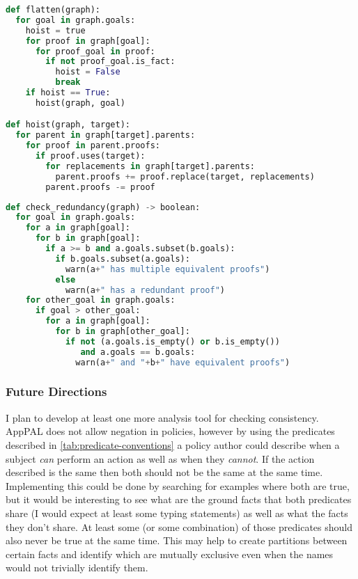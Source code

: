 \documentclass[a4paper]{scrartcl}
\begin{document}
\begin{lstlisting}[language=Python,float,caption={Procedure for flattening the redundancy graph.},label={alg:flatten}]
def flatten(graph):
  for goal in graph.goals:
    hoist = true
    for proof in graph[goal]:
      for proof_goal in proof:
        if not proof_goal.is_fact:
          hoist = False
          break
    if hoist == True:
      hoist(graph, goal)

def hoist(graph, target):
  for parent in graph[target].parents:
    for proof in parent.proofs:
      if proof.uses(target):
        for replacements in graph[target].parents:
          parent.proofs += proof.replace(target, replacements)
        parent.proofs -= proof
\end{lstlisting}

\begin{lstlisting}[language=Python,float,caption={Procedure to check for redundancy.},label={alg:redundancy}]
def check_redundancy(graph) -> boolean:
  for goal in graph.goals:
    for a in graph[goal]:
      for b in graph[goal]:
        if a >= b and a.goals.subset(b.goals):
          if b.goals.subset(a.goals):
            warn(a+" has multiple equivalent proofs") 
          else
            warn(a+" has a redundant proof")
    for other_goal in graph.goals:
      if goal > other_goal:
        for a in graph[goal]:
          for b in graph[other_goal]:
            if not (a.goals.is_empty() or b.is_empty())
               and a.goals == b.goals:
              warn(a+" and "+b+" have equivalent proofs")
\end{lstlisting}

\subsubsection*{Future Directions}

I plan to develop at least one more analysis tool for checking consistency.
AppPAL does not allow negation in policies, however by using the predicates
described in \autoref{tab:predicate-conventions} a policy author could describe
when a subject \emph{can} perform an action as well as when they \emph{cannot}.
If the action described is the same then both should not be the same at the same
time.  Implementing this could be done by searching for examples where both are
true, but it would be interesting to see what are the ground facts that both
predicates share (I would expect at least some typing statements) as well as
what the facts they don't share.  At least some (or some combination) of those
predicates should also never be true at the same time.  This may help to create
partitions between certain facts and identify which are mutually exclusive even
when the names would not trivially identify them.
\end{document}
